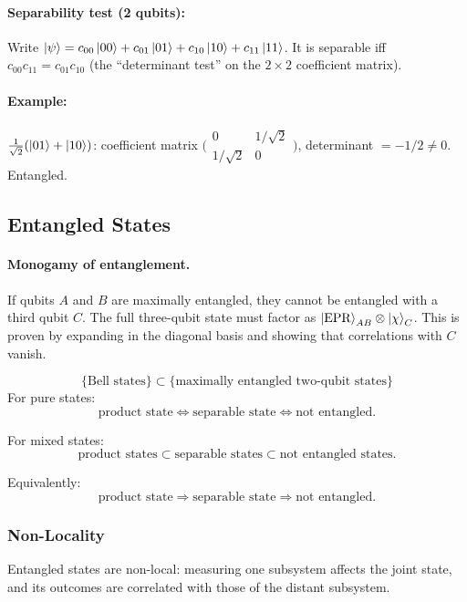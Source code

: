 \documentclass[10pt,a4paper]{article}
\begin{document}
\paragraph{Separability test (2 qubits):} Write $\ket{\psi}=c_{00}\ket{00}+c_{01}\ket{01}+c_{10}\ket{10}+c_{11}\ket{11}$. It is separable iff $c_{00}c_{11}=c_{01}c_{10}$ (the ``determinant test'' on the $2\times 2$ coefficient matrix).

\paragraph{Example:} $\frac{1}{\sqrt{2}}(\ket{01}+\ket{10})$: coefficient matrix $\bigl(\begin{smallmatrix}0&1/\sqrt{2}\\1/\sqrt{2}&0\end{smallmatrix}\bigr)$, determinant $=-1/2\neq 0$. Entangled.

\subsection{Entangled States}

\paragraph{Monogamy of entanglement.} If qubits $A$ and $B$ are maximally entangled, they cannot be entangled with a third qubit $C$. The full three-qubit state must factor as $\ket{\text{EPR}}_{AB}\otimes\ket{\chi}_C$. This is proven by expanding in the diagonal basis and showing that correlations with $C$ vanish.

\[
\{\text{Bell states}\} \subset \{\text{maximally entangled two-qubit states}\}
\]
For pure states:
\[
\text{product state} \iff \text{separable state} \iff \text{not entangled}.
\]

For mixed states:
\[
\text{product states} \subset \text{separable states} \subset \text{not entangled states}.
\]

Equivalently:
\[
\text{product state} \Rightarrow \text{separable state} \Rightarrow \text{not entangled}.
\]

\subsubsection{Non-Locality}
Entangled states are non-local: measuring one subsystem affects the joint state, and its outcomes are correlated with those of the distant subsystem.
\end{document}
